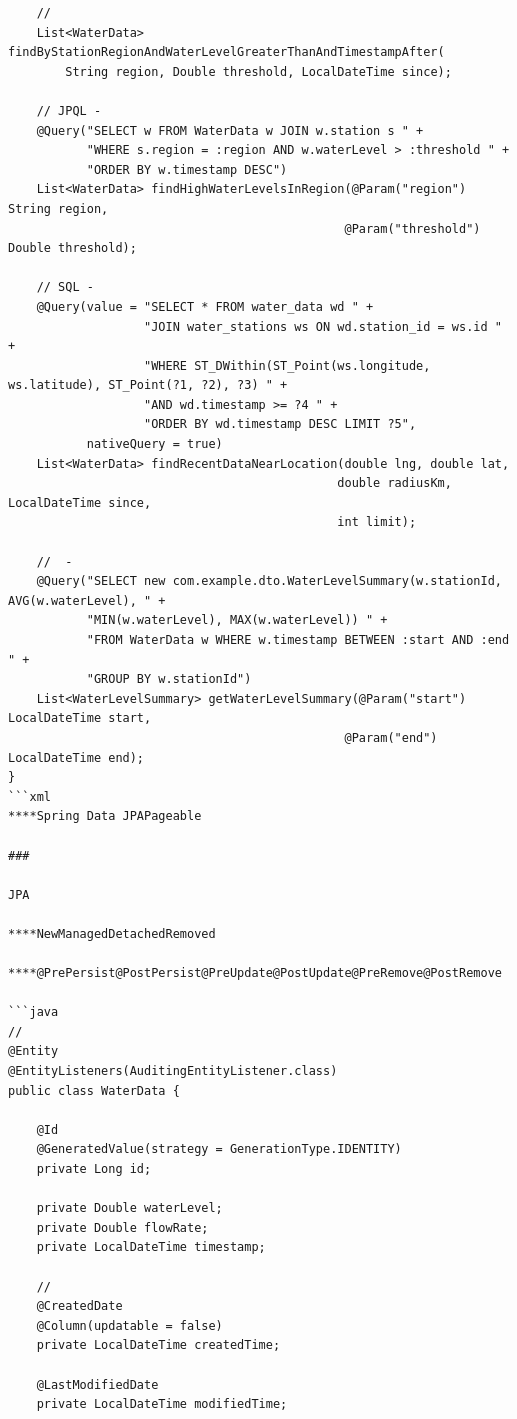 \begin{verbatim}
    // 
    List<WaterData> findByStationRegionAndWaterLevelGreaterThanAndTimestampAfter(
        String region, Double threshold, LocalDateTime since);
    
    // JPQL - 
    @Query("SELECT w FROM WaterData w JOIN w.station s " +
           "WHERE s.region = :region AND w.waterLevel > :threshold " +
           "ORDER BY w.timestamp DESC")
    List<WaterData> findHighWaterLevelsInRegion(@Param("region") String region,
                                               @Param("threshold") Double threshold);
    
    // SQL - 
    @Query(value = "SELECT * FROM water_data wd " +
                   "JOIN water_stations ws ON wd.station_id = ws.id " +
                   "WHERE ST_DWithin(ST_Point(ws.longitude, ws.latitude), ST_Point(?1, ?2), ?3) " +
                   "AND wd.timestamp >= ?4 " +
                   "ORDER BY wd.timestamp DESC LIMIT ?5",
           nativeQuery = true)
    List<WaterData> findRecentDataNearLocation(double lng, double lat, 
                                              double radiusKm, LocalDateTime since, 
                                              int limit);
    
    //  - 
    @Query("SELECT new com.example.dto.WaterLevelSummary(w.stationId, AVG(w.waterLevel), " +
           "MIN(w.waterLevel), MAX(w.waterLevel)) " +
           "FROM WaterData w WHERE w.timestamp BETWEEN :start AND :end " +
           "GROUP BY w.stationId")
    List<WaterLevelSummary> getWaterLevelSummary(@Param("start") LocalDateTime start,
                                               @Param("end") LocalDateTime end);
}
```xml
****Spring Data JPAPageable

### 

JPA

****NewManagedDetachedRemoved

****@PrePersist@PostPersist@PreUpdate@PostUpdate@PreRemove@PostRemove

```java
// 
@Entity
@EntityListeners(AuditingEntityListener.class)
public class WaterData {
    
    @Id
    @GeneratedValue(strategy = GenerationType.IDENTITY)
    private Long id;
    
    private Double waterLevel;
    private Double flowRate;
    private LocalDateTime timestamp;
    
    // 
    @CreatedDate
    @Column(updatable = false)
    private LocalDateTime createdTime;
    
    @LastModifiedDate
    private LocalDateTime modifiedTime;
    

\end{verbatim}
